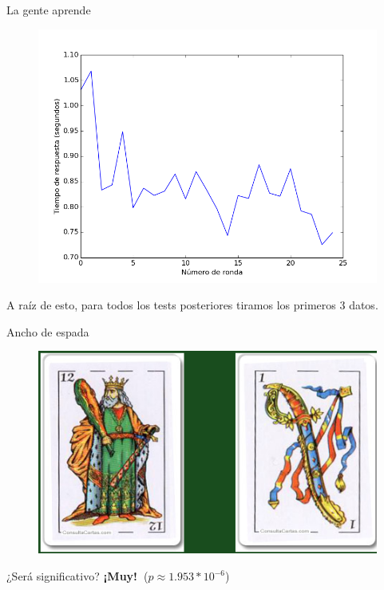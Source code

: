 \documentclass{beamer}
\begin{document}
\begin{frame}{La gente aprende}
\begin{figure}
   \includegraphics[width=0.8\linewidth]{graficos/tiempo_por_ronda.png}
\end{figure}
\begin{center}A raíz de esto, para todos los tests posteriores tiramos los primeros 3 datos.
\end{center}
\end{frame}


\begin{frame}{Ancho de espada}
\begin{figure}
   \includegraphics[width=0.8\linewidth]{examples_img/rondas_1.png}
\end{figure}
\begin{center}¿Será significativo?
\pause
\textbf{¡Muy!\ }($p \approx 1.953*10^{-6}$)
\end{center}
\end{frame}
\end{document}
